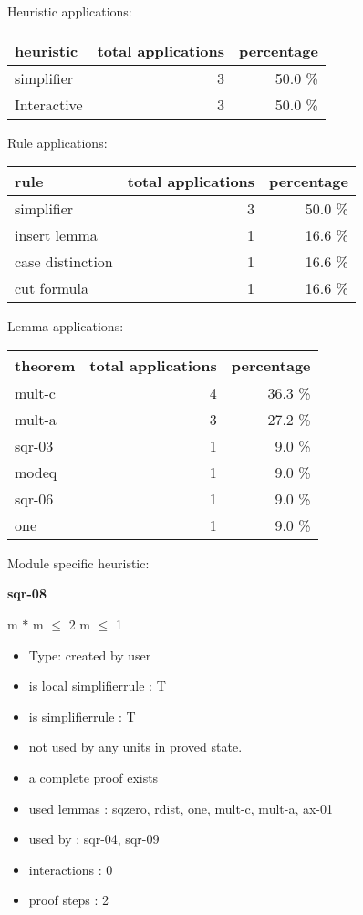 \documentclass[a4paper]{article}
\begin{document}
\medskip


Heuristic applications:

\begin{supertabular}{l|r|r}
heuristic	& total applications & percentage \\ \hline
simplifier & 3 & 50.0 \% \\
Interactive & 3 & 50.0 \% \\

\end{supertabular}

Rule applications:

\begin{supertabular}{l|r|r}
rule	        & total applications & percentage \\ \hline
simplifier & 3 & 50.0 \% \\
insert lemma & 1 & 16.6 \% \\
case distinction & 1 & 16.6 \% \\
cut formula & 1 & 16.6 \% \\

\end{supertabular}

Lemma applications:

\begin{supertabular}{l|r|r}
theorem	        & total applications & percentage \\ \hline
mult-c & 4 & 36.3 \% \\
mult-a & 3 & 27.2 \% \\
sqr-03 & 1 & 9.0 \% \\
modeq & 1 & 9.0 \% \\
sqr-06 & 1 & 9.0 \% \\
one & 1 & 9.0 \% \\

\end{supertabular}

Module specific heuristic:

\pagebreak

{\LARGE\bf sqr-08}\label{lemma-sqr-08}

\medskip

 \Fol m $*$ m $\le$ 2 \Equiv m $\le$ 1

\begin{itemize}

\item Type: created by user

\item is local simplifierrule : T
\item is simplifierrule : T
\item not used by any units in proved state.
\item       a complete proof exists
\item       used lemmas  : sqzero, rdist, one, mult-c, mult-a, ax-01
\item       used by      : sqr-04, sqr-09
\item       interactions : 0
\item       proof steps  : 2
\end{itemize}
\end{document}
